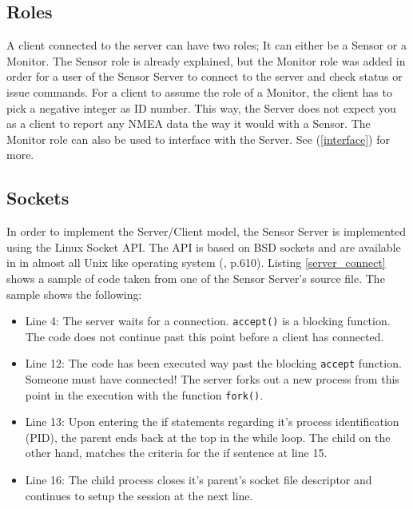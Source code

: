 \documentclass[12pt,english,a4paper]{report}
\begin{document}
\newpage
\subsection{Roles}
A client connected to the server can have two roles; It can either be a Sensor or a Monitor. The Sensor role is already explained, but the Monitor role was added in order for a user of the Sensor Server to connect to the server and check status or issue commands. For a client to assume the role of a Monitor, the client has to pick a negative integer as ID number. This way, the Server does not expect you as a client to report any NMEA data the way it would with a Sensor. The Monitor role can also be used to interface with the Server. See (\ref{interface}) for more.

\subsection{Sockets}
In order to implement the Server/Client model, the Sensor Server is implemented using the Linux Socket API. The API is based on BSD sockets and are available in in almost all Unix like operating system (\cite{LINUX_KERNEL}, p.610). Listing \ref{server_connect} shows a sample of code taken from one of the Sensor Server's source file. The sample shows the following:
\begin{itemize}
  \item Line 4: The server waits for a connection. \texttt{accept()} is a blocking function. The code does not continue past this point before a client has connected.  
  \item Line 12: The code has been executed way past the blocking \texttt{accept} function. Someone must have connected! The server forks out a new process from this point in the execution with the function \texttt{fork()}.
  \item Line 13: Upon entering the if statements regarding it's process identification (PID), the parent ends back at the top in the while loop. The child on the other hand, matches the criteria for the if sentence at line 15.
  \item Line 16: The child process closes it's parent's socket file descriptor and continues to setup the session at the next line.
\end{itemize}
\end{document}

